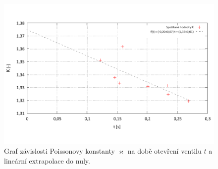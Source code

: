\documentclass[english]{article}
\begin{document}
	\begin{figure}[h!]
	\begin{center}
	\vspace*{-1cm}
	    \includegraphics[width=\linewidth]{../gnuplot/data.pdf}
	    \vspace*{-1.5cm}
	    	\caption{Graf závislosti Poissonovy konstanty $\varkappa$ na době otevření ventilu $t$ a lineární extrapolace do nuly.}
			\label{fig:graf}
	\end{center}
	\end{figure}		
\end{document}
